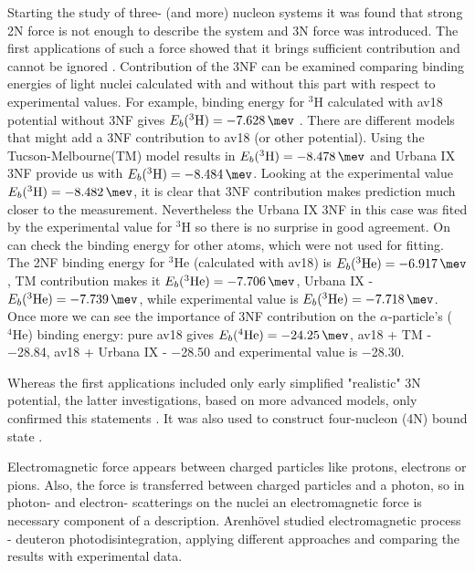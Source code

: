Starting the study of three- (and more) nucleon systems it was found that 
strong 2N force is not enough to describe
the system and 3N force was introduced. The first applications of such
a force showed that it brings sufficient contribution and cannot be ignored \cite{GLOCKLE1982343}.
Contribution of the 3NF can be examined comparing binding energies of light nuclei calculated
with and without this part with respect to experimental values.  
For example, binding energy for $^3$H calculated with \gls{av18} potential
without 3NF gives $E_b(^3\mathrm{H}) = \SI{-7.628}{\mev}$ \cite{NoggaAV18}. There are different
models that might add a 3NF contribution to \gls{av18} (or other potential). 
Using the Tucson-Melbourne(TM) model \cite{Tucson-Melbourne}   results
in $E_b(^3\mathrm{H}) = \SI{-8.478}{\mev}$ and Urbana IX \cite{Urbana3NF} 3NF provide us with 
$E_b(^3\mathrm{H}) = \SI{-8.484}{\mev}$. 
Looking at the experimental value $E_b(^3\mathrm{H}) = \SI{-8.482}{\mev}$,
it is clear that 3NF contribution makes prediction much closer to the measurement.
Nevertheless the Urbana IX 3NF in this case was fited by the experimental value for 
$^3\mathrm{H}$ so there is no surprise in good agreement.
On can check the binding energy for  other atoms, which were not used for fitting. 
The 2NF binding energy for $^3$He (calculated with \gls{av18})
is $E_b(^3\mathrm{He}) = \SI{-6.917}{\mev}$, TM contribution makes it $E_b(^3\mathrm{He}) = \SI{-7.706}{\mev}$,
Urbana IX - $E_b(^3\mathrm{He}) = \SI{-7.739}{\mev}$, while experimental value
is $E_b(^3\mathrm{He}) = \SI{-7.718}{\mev}$.
Once more we can see the importance of 3NF contribution on the $\alpha$-particle's ($^4\mathrm{He}$) binding energy:
pure \gls{av18} gives $E_b(^4\mathrm{He}) = \SI{-24.25}{\mev}$, \gls{av18} + TM - \SI{-28.84}{\mev}, \gls{av18} + Urbana IX - \SI{-28.50}{\mev} and experimental value
is \SI{-28.30}{\mev}.

Whereas the first applications included only early simplified "realistic" 3N potential, the latter
investigations, based on more advanced models, only confirmed this statements \cite{StoksPhysRevC49, AV18Wiringa}.
It was also used to construct four-nucleon (4N) bound state \cite{NoggaPhysRevLett}.

Electromagnetic force appears between charged particles like protons, electrons or pions.
Also, the force is transferred between charged particles and a photon, so 
in photon- and electron- scatterings on the nuclei an electromagnetic
force is necessary component of a description. Arenh\"{o}vel \cite{ArenhovelPhotodisint1991} 
studied electromagnetic process - deuteron photodisintegration,
applying different approaches and comparing the results with
experimental data.

